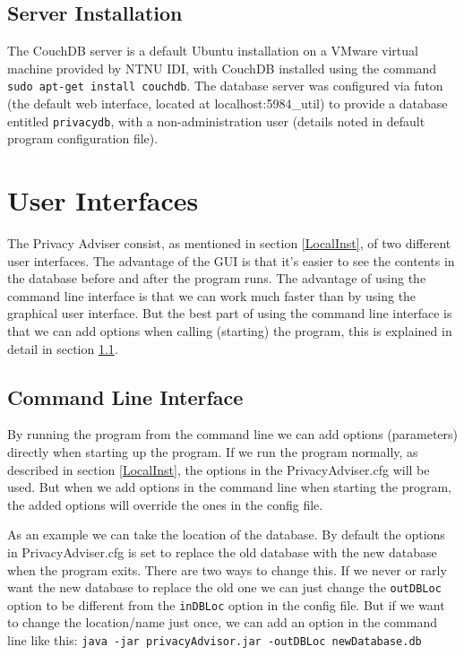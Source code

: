 \subsection{Server Installation}
The CouchDB server is a default Ubuntu installation on a VMware virtual machine provided by NTNU IDI, with CouchDB installed using the command \texttt{sudo apt-get install couchdb}. The database server was configured via futon (the default web interface, located at localhost:5984\/\_util) to provide a database entitled \texttt{privacydb}, with a non-administration user (details noted in default program configuration file).

\section{User Interfaces}
The Privacy Adviser consist, as mentioned in section \ref{LocalInst}, of two different user interfaces. The advantage of the GUI is that it's easier to see the contents in the database before and after the program runs. The advantage of using the command line interface is that we can work much faster than by using the graphical user interface. But the best part of using the command line interface is that we can add options when calling (starting) the program, this is explained in detail in section \ref{cliExplained}.

\subsection{Command Line Interface} \label{cliExplained}
By running the program from the command line we can add options (parameters) directly when starting up the program. If we run the program normally, as described in section \ref{LocalInst}, the options in the PrivacyAdviser.cfg will be used. But when we add options in the command line when starting the program, the added options will override the ones in the config file.

As an example we can take the location of the database. By default the options in PrivacyAdviser.cfg is set to replace the old database with the new database when the program exits. There are two ways to change this. If we never or rarly want the new database to replace the old one we can just change the \texttt{outDBLoc} option to be different from the \texttt{inDBLoc} option in the config file. But if we want to change the location/name just once, we can add an option in the command line like this:
\texttt{java -jar privacyAdvisor.jar -outDBLoc newDatabase.db}

